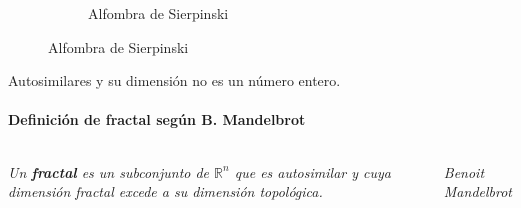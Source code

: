 \begin{frame}{\insertsectionhead}
\begin{figure}[ht!]
\begin{subfigure}[b]{0.23\textwidth}
      \caption*{Alfombra de Sierpinski}
    \end{subfigure}
  \end{figure}
\vspace{\fill}
\pause
\centering Autosimilares y su dimensión no es un número entero.

\end{frame}

\begin{frame}{\insertsectionhead}
  \framesubtitle{Definición de fractal según B. Mandelbrot}
  \begin{columns}[c, onlytextwidth]
        {\Large\textit{Un \textbf{fractal} es un subconjunto de $\mathbb R^n$ que es autosimilar y cuya dimensión fractal excede a su dimensión topológica.}}
        
        \begin{flushright}
        {\large\textit{Benoit Mandelbrot}}
        \end{flushright}
    \hfill
    \center
  \end{columns}
\end{frame}


